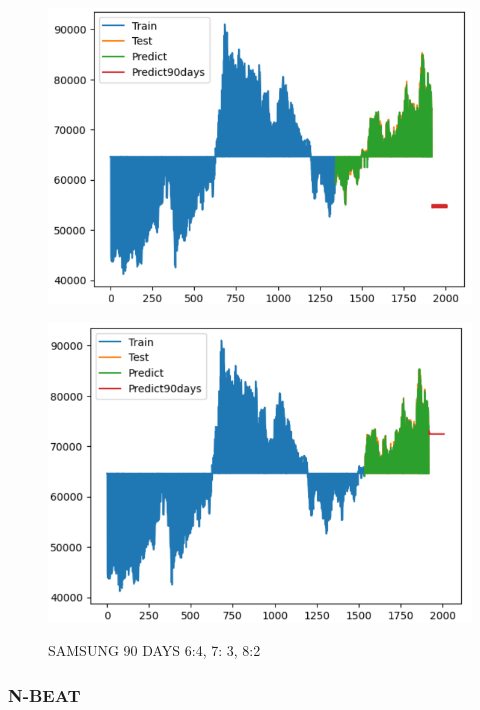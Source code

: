 \documentclass{article}
\begin{document}
\begin{multicols}{2}
\begin{figure}[H]
\begin{minipage}{0.15\textwidth}
    \label{fig:1}
    \end{minipage}%
    \begin{minipage}{0.15\textwidth}
    \centering
    \includegraphics[width=1\textwidth]{Image/XGBoost/SAMSUNG_7_3_90.png}
  
    \label{fig:2}
    \end{minipage}%
    \begin{minipage}{0.15\textwidth}
    \centering
    \includegraphics[width=1\textwidth]{Image/XGBoost/SAMSUNG_8_2_90.png}

    \label{fig:3}
    \end{minipage}
    \caption{SAMSUNG 90 DAYS  6:4, 7: 3, 8:2 }
\end{figure}

\subsubsection{N-BEAT}




\end{multicols}
\end{document}
